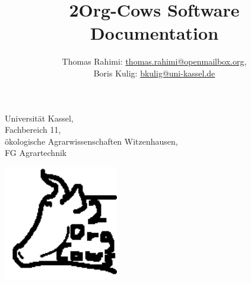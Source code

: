\documentclass[a4paper,12pt]{article}
\title{2Org-Cows Software Documentation}
\author{Thomas Rahimi: \href{mailto:thomas.rahimi@openmailbox.org}{thomas.rahimi@openmailbox.org},\\ Boris Kulig: \href{mailto:bkulig@uni-kassel.de}{bkulig@uni-kassel.de}}
\date{}
\begin{document}
\maketitle
\begin{center}
 Universität Kassel,\\
 Fachbereich 11,\\ 
 ökologische Agrarwissenschaften Witzenhausen,\\
 FG Agrartechnik
\end{center}

\bigskip

\begin{center}
 \includegraphics[width=5cm,keepaspectratio=true]{./Logo-2Org-Cows.png}
\end{center}
\thispagestyle{empty}
\newpage

\clearpage
{} %
\tableofcontents
{}
\listoffigures
{}
\thispagestyle{empty}
\newpage
















\end{document}
